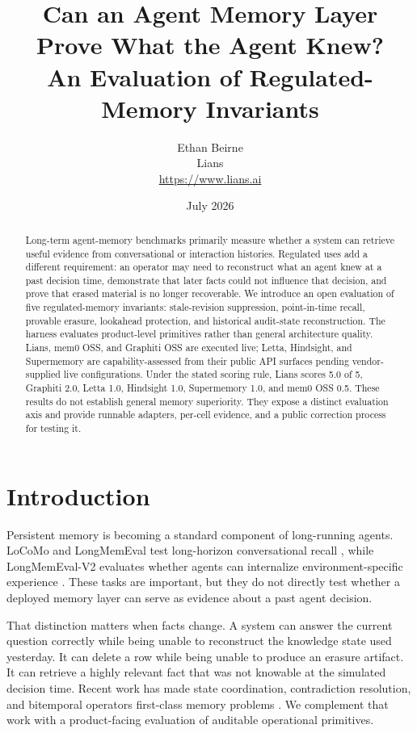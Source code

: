 \documentclass[11pt]{article}
\title{Can an Agent Memory Layer Prove What the Agent Knew?\\
\large An Evaluation of Regulated-Memory Invariants}
\author{Ethan Beirne\\Lians\\\url{https://www.lians.ai}}
\date{July 2026}
\begin{document}
\maketitle

\begin{abstract}
Long-term agent-memory benchmarks primarily measure whether a system can retrieve useful evidence from conversational or interaction histories. Regulated uses add a different requirement: an operator may need to reconstruct what an agent knew at a past decision time, demonstrate that later facts could not influence that decision, and prove that erased material is no longer recoverable. We introduce an open evaluation of five regulated-memory invariants: stale-revision suppression, point-in-time recall, provable erasure, lookahead protection, and historical audit-state reconstruction. The harness evaluates product-level primitives rather than general architecture quality. Lians, mem0 OSS, and Graphiti OSS are executed live; Letta, Hindsight, and Supermemory are capability-assessed from their public API surfaces pending vendor-supplied live configurations. Under the stated scoring rule, Lians scores 5.0 of 5, Graphiti 2.0, Letta 1.0, Hindsight 1.0, Supermemory 1.0, and mem0 OSS 0.5. These results do not establish general memory superiority. They expose a distinct evaluation axis and provide runnable adapters, per-cell evidence, and a public correction process for testing it.
\end{abstract}

\section{Introduction}
Persistent memory is becoming a standard component of long-running agents. LoCoMo and LongMemEval test long-horizon conversational recall \cite{locomo,longmemeval}, while LongMemEval-V2 evaluates whether agents can internalize environment-specific experience \cite{longmemevalv2}. These tasks are important, but they do not directly test whether a deployed memory layer can serve as evidence about a past agent decision.

That distinction matters when facts change. A system can answer the current question correctly while being unable to reconstruct the knowledge state used yesterday. It can delete a row while being unable to produce an erasure artifact. It can retrieve a highly relevant fact that was not knowable at the simulated decision time. Recent work has made state coordination, contradiction resolution, and bitemporal operators first-class memory problems \cite{worlddb,toki,atma}. We complement that work with a product-facing evaluation of auditable operational primitives.
\end{document}
